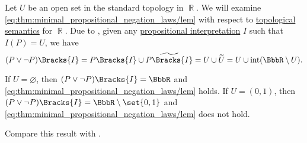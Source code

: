 \begin{example}\label{ex:topological_semantics_lem_counterexample}
  Let \( U \) be an open set in the standard topology in \( \BbbR \). We will examine \eqref{eq:thm:minimal_propositional_negation_laws/lem} with respect to \hyperref[def:propositional_topological_semantics]{topological semantics} for \( \BbbR \). Due to , given any \hyperref[def:propositional_valuation]{propositional interpretation} \( I \) such that \( I(P) = U \), we have
  \begin{equation*}
    (P \vee \neg P)\Bracks{I}
    =
    P\Bracks{I} \cup \widetilde{P\Bracks{I}}
    =
    U \cup \widetilde{U}
    =
    U \cup \inter(\BbbR \setminus U).
  \end{equation*}

  If \( U = \varnothing \), then \( (P \vee \neg P)\Bracks{I} = \BbbR \) and \eqref{eq:thm:minimal_propositional_negation_laws/lem} holds. If \( U = (0, 1) \), then \( (P \vee \neg P)\Bracks{I} = \BbbR \setminus \set{ 0, 1 } \) and \eqref{eq:thm:minimal_propositional_negation_laws/lem} does not hold.

  Compare this result with .
\end{example}

